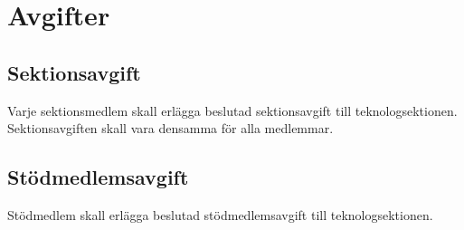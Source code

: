 \section{Avgifter}

\subsection{Sektionsavgift}
Varje sektionsmedlem skall erlägga beslutad sektionsavgift till teknologsektionen. Sektionsavgiften skall vara densamma för alla medlemmar.

\subsection{Stödmedlemsavgift}
\label{subsec:stodmedlemsavgift}
Stödmedlem skall erlägga beslutad stödmedlemsavgift till teknologsektionen.
